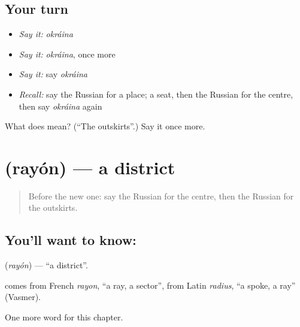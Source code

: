 \subsection*{Your turn}
\begin{itemize}
\raggedright
  \item \emph{Say it:} \emph{okráina}
  \item \emph{Say it:} \emph{okráina}, once more
  \item \emph{Say it:} say \emph{okráina}
  \item \emph{Recall:} say the Russian for a place; a seat, then the Russian for the centre, then say \emph{okráina} again
\end{itemize}

\begin{tcolorbox}[breakable,colback=teal!4,colframe=teal!35!black,title={Before you move on}]
What does  mean? (\textquotedblleft{}The outskirts\textquotedblright{}.) Say it once more.
\end{tcolorbox}
\section[\texorpdfstring{\ru{район} (rayón)}{район (rayón)}]{ (rayón) — a district}

\label{lesson:RU-C151-rayon}



\begin{quote}
Before the new one: say the Russian for the centre, then the Russian for the outskirts.
\end{quote}

\subsection*{You'll want to know: }
\textbf{} (\emph{rayón}) — \textquotedblleft{}a district\textquotedblright{}.

\begin{cousinweb}
\textbf{} comes from French \emph{rayon}, \textquotedblleft{}a ray, a sector\textquotedblright{}, from Latin \emph{radius}, \textquotedblleft{}a spoke, a ray\textquotedblright{} (Vasmer).
\end{cousinweb}

\begin{grammarlens}[title={What you've built}]
One more word for this chapter.
\end{grammarlens}

